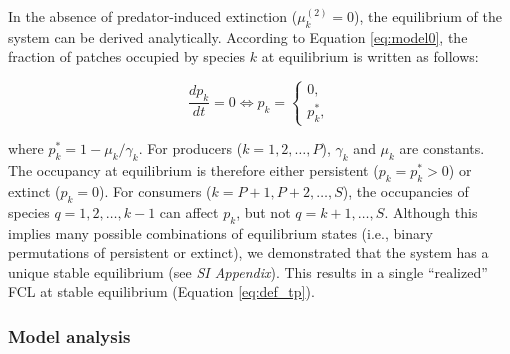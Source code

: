 \documentclass[11pt, class=article, crop=false]{standalone}
\begin{document}
In the absence of predator-induced extinction ($\mu_{k}^{(2)}=0$), the equilibrium of the system can be derived analytically.
According to  Equation \ref{eq:model0}, the fraction of patches occupied by species $k$ at equilibrium is written as follows:

\begin{equation}
    \frac{dp_k}{dt} = 0 \Leftrightarrow p_k = \left\{\begin{array}{c}
         0,\\
         p_{k}^{*}, 
    \end{array}
    \right.
\end{equation}

where $p_{k}^{*} = 1 - \mu_k / \gamma_k$. 
For producers ($k=1, 2, \ldots, P$), $\gamma_k$ and $\mu_k$ are constants.
The occupancy at equilibrium is therefore either persistent ($p_k = p_k^* > 0$) or extinct ($p_k = 0$).
For consumers ($k = P+1, P+2, \ldots, S$), the occupancies of species $q = 1, 2, \ldots, k - 1$ can affect $p_k$, but not $q = k + 1, \ldots, S$.
Although this implies many possible combinations of equilibrium states (i.e., binary permutations of persistent or extinct), we demonstrated that the system has a unique stable equilibrium (see \textit{SI Appendix}).
This results in a single ``realized'' FCL at stable equilibrium (Equation \ref{eq:def_tp}).


\subsubsection{Model analysis}
\end{document}
